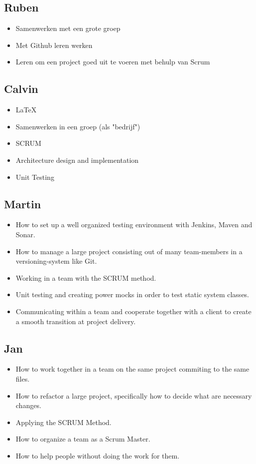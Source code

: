 \documentclass{article}
\begin{document}
\subsection*{Ruben}
\begin{itemize}
	\item Samenwerken met een grote groep
	\item Met Github leren werken
	\item Leren om een project goed uit te voeren met behulp van Scrum
\end{itemize}
\subsection*{Calvin}
\begin{itemize}
 	\item \LaTeX
	\item Samenwerken in een groep (als "bedrijf")
	\item SCRUM
	\item Architecture design and  implementation
	\item Unit Testing
\end{itemize}
\subsection*{Martin}
\begin{itemize}
  \item How to set up a well organized testing environment with Jenkins, Maven and Sonar.
  \item How to manage a large project consisting out of many team-members in a versioning-system like Git.
  \item Working in a team with the SCRUM method.
  \item Unit testing and creating power mocks in order to test static system classes.
  \item Communicating within a team and cooperate together with a client to create a smooth transition at project delivery.
\end{itemize}
\subsection*{Jan}
\begin{itemize}
	\item How to work together in a team on the same project commiting to the same files.
	\item How to refactor a large project, specifically how to decide what are necessary changes.
	\item Applying the SCRUM Method.
	\item How to organize a team as a Scrum Master.
	\item How to help people without doing the work for them.
\end{itemize}
\end{document}
